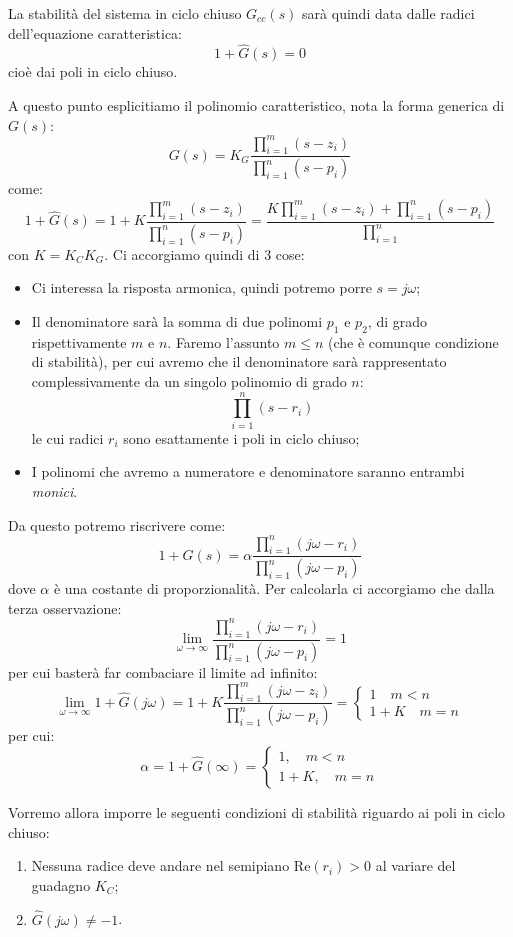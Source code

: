 \documentclass[a4paper,11pt]{article}
\begin{document}
La stabilità del sistema in ciclo chiuso $G_{cc}(s)$ sarà quindi data dalle radici dell'equazione caratteristica:
$$
1 + \hat{G}(s) = 0
$$
cioè dai poli in ciclo chiuso.

A questo punto esplicitiamo il polinomio caratteristico, nota la forma generica di $G(s)$:
$$
G(s) = K_G \frac{ \prod_{i=1}^m (s - z_i) }{ \prod_{i=1}^n (s - p_i) }
$$
come:
$$
1 + \hat{G}(s) = 1 + K \frac{ \prod_{i = 1}^m (s - z_i) }{ \prod_{i = 1}^n (s - p_i) } = \frac{ K \prod_{i = 1}^m (s - z_i) + \prod_{i = 1}^n (s - p_i) }{ \prod_{i = 1}^n }
$$
con $K = K_C K_G$.
Ci accorgiamo quindi di 3 cose:
\begin{itemize}
	\item Ci interessa la risposta armonica, quindi potremo porre $s = j\omega$;
	\item Il denominatore sarà la somma di due polinomi $p_1$ e $p_2$, di grado rispettivamente $m$ e $n$.
		Faremo l'assunto $m \leq n$ (che è comunque condizione di stabilità), per cui avremo che il denominatore sarà rappresentato complessivamente da un singolo polinomio di grado $n$:
		$$
		\prod_{i = 1}^n (s - r_i)
		$$
		le cui radici $r_i$ sono esattamente i poli in ciclo chiuso;
	\item I polinomi che avremo a numeratore e denominatore saranno entrambi \textit{monici}.
\end{itemize}
Da questo potremo riscrivere come:
$$
1 + \hat{G}(s) = \alpha \frac{\prod_{i = 1}^n (j \omega - r_i)}{\prod_{i = 1}^n (j \omega - p_i)}
$$
dove $\alpha$ è una costante di proporzionalità.
Per calcolarla ci accorgiamo che dalla terza osservazione:
$$
\lim_{\omega \rightarrow \infty} \frac{\prod_{i = 1}^n (j \omega - r_i)}{\prod_{i = 1}^n (j \omega - p_i)} = 1
$$
per cui basterà far combaciare il limite ad infinito:
$$
\lim_{\omega \rightarrow \infty} 1 + \hat{G}(j \omega) = 1 + K \frac{ \prod_{i = 1}^m (j \omega - z_i) }{ \prod_{i = 1}^n (j \omega - p_i) } =
\begin{cases}
	1 \quad m < n \\ 
	1 + K \quad m = n
\end{cases}
$$
per cui:
\[
	\alpha = 1 + \hat{G}(\infty) =			
	\begin{cases}
		1, \quad m < n \\
		1 + K, \quad m = n
	\end{cases}
\]

Vorremo allora imporre le seguenti condizioni di stabilità riguardo ai poli in ciclo chiuso:
\begin{enumerate}
	\item Nessuna radice deve andare nel semipiano $\mathrm{Re}(r_i) > 0$ al variare del guadagno $K_C$;
	\item $\hat{G}(j \omega) \neq -1$.
\end{enumerate}
\end{document}
